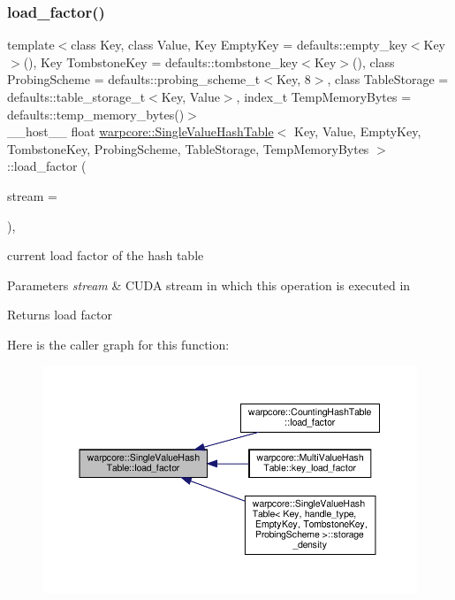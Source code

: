\subsubsection{\texorpdfstring{load\+\_\+factor()}{load\_factor()}}
{\footnotesize\ttfamily template$<$class Key, class Value, Key Empty\+Key = defaults\+::empty\+\_\+key$<$\+Key$>$(), Key Tombstone\+Key = defaults\+::tombstone\+\_\+key$<$\+Key$>$(), class Probing\+Scheme = defaults\+::probing\+\_\+scheme\+\_\+t$<$\+Key, 8$>$, class Table\+Storage = defaults\+::table\+\_\+storage\+\_\+t$<$\+Key, Value$>$, index\+\_\+t Temp\+Memory\+Bytes = defaults\+::temp\+\_\+memory\+\_\+bytes()$>$ \\
\+\_\+\+\_\+host\+\_\+\+\_\+ float \hyperlink{classwarpcore_1_1SingleValueHashTable}{warpcore\+::\+Single\+Value\+Hash\+Table}$<$ Key, Value, Empty\+Key, Tombstone\+Key, Probing\+Scheme, Table\+Storage, Temp\+Memory\+Bytes $>$\+::load\+\_\+factor (\begin{DoxyParamCaption}\item[{cuda\+Stream\+\_\+t}]{stream = {} }\end{DoxyParamCaption})\hspace{0.3cm}{\ttfamily [inline]}, {\ttfamily [noexcept]}}



current load factor of the hash table 


\begin{DoxyParams}{Parameters}
{\em stream} & C\+U\+DA stream in which this operation is executed in \\
\hline
\end{DoxyParams}
\begin{DoxyReturn}{Returns}
load factor 
\end{DoxyReturn}
Here is the caller graph for this function\+:
\nopagebreak
\begin{figure}[H]
\begin{center}
\leavevmode
\includegraphics[width=350pt]{classwarpcore_1_1SingleValueHashTable_afc3b7f76eec998a3d4878edf1ae1419b_icgraph}
\end{center}
\end{figure}
\mbox{\label{classwarpcore_1_1SingleValueHashTable_a0d202448fc1427da9d4a745ec28b5976}} 
